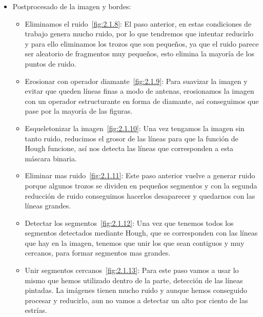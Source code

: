 \begin{itemize}
\item Postprocesado de la imagen y bordes:
	\begin{itemize}
		\item Eliminamos el ruido~\ref{fig:2.1.8}:
El paso anterior, en estas condiciones de trabajo genera mucho ruido, por lo que tendremos que intentar reducirlo y para ello eliminamos los trozos que son pequeños, ya que el ruido parece ser aleatorio de fragmentos muy pequeños, esto elimina la mayoría de los puntos de ruido.
		\item Erosionar con operador diamante~\ref{fig:2.1.9}:
Para suavizar la imagen y evitar que queden líneas finas a modo de antenas, erosionamos la imagen con un operador estructurante en forma de diamante, así conseguimos que pase por la mayoría de las figuras.
		\item Esqueletonizar la imagen~\ref{fig:2.1.10}:
Una vez tengamos la imagen sin tanto ruido, reducimos el grosor de las líneas para que la función de Hough funcione, así nos detecta las líneas que corresponden a esta máscara binaria.
		\item Eliminar mas ruido~\ref{fig:2.1.11}:
Este paso anterior vuelve a generar ruido porque algunos trozos se dividen en pequeños segmentos y con la segunda reducción de ruido conseguimos hacerlos desaparecer y quedarnos con las líneas grandes.
		\item Detectar los segmentos~\ref{fig:2.1.12}:
Una vez que tenemos todos los segmentos detectados mediante Hough, que se corresponden con las líneas que hay en la imagen, tenemos que unir los que sean contiguos y muy cercanos, para formar segmentos mas grandes.
		\item Unir segmentos cercanos~\ref{fig:2.1.13}:
Para este paso vamos a usar lo mismo que hemos utilizado dentro de la parte, detección de las líneas pintadas.
La imágenes tienen mucho ruido y aunque hemos conseguido procesar y reducirlo, aun no vamos a detectar un alto por ciento de las estrías.
	\end{itemize}

\end{itemize}



